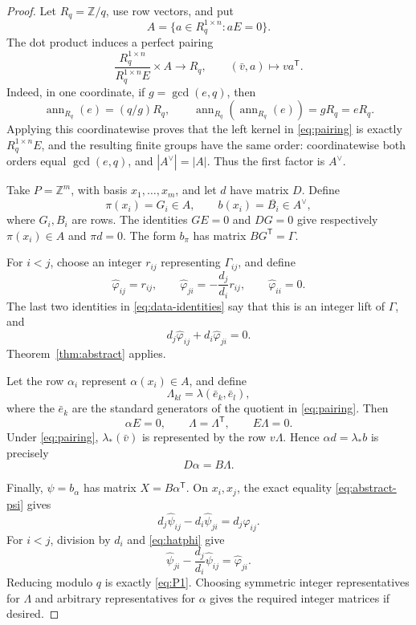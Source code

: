 \documentclass[11pt]{amsart}
\theoremstyle{definition}
\theoremstyle{remark}
\newcommand{\Z}{\mathbb Z}
\newcommand{\ann}{\operatorname{ann}}
\begin{document}
\begin{proof}
Let \(R_q=\Z/q\), use row vectors, and put
\[
                       A=\{a\in R_q^{1\times n}:aE=0\}.
\]
The dot product induces a perfect pairing
\begin{equation}\label{eq:pairing}
 \frac{R_q^{1\times n}}{R_q^{1\times n}E}\times A\longrightarrow R_q,
 \qquad(\bar v,a)\longmapsto va^{\mathsf T}.
\end{equation}
Indeed, in one coordinate, if \(g=\gcd(e,q)\), then
\[
 \ann_{R_q}(e)=(q/g)R_q,\qquad
 \ann_{R_q}(\ann_{R_q}(e))=gR_q=eR_q.
\]
Applying this coordinatewise proves that the left kernel in
\eqref{eq:pairing} is exactly \(R_q^{1\times n}E\), and the resulting
finite groups have the same order: coordinatewise both orders equal
\(\gcd(e,q)\), and \(|A^\vee|=|A|\).  Thus the first factor is
\(A^\vee\).

Take \(P=\Z^m\), with basis \(x_1,\ldots,x_m\), and let \(d\) have
matrix \(D\).  Define
\[
                    \pi(x_i)=G_i\in A,\qquad
                    b(x_i)=\overline{B_i}\in A^\vee,
\]
where \(G_i,B_i\) are rows.  The identities \(GE=0\) and \(DG=0\)
give respectively \(\pi(x_i)\in A\) and \(\pi d=0\).
The form \(b_\pi\) has matrix \(BG^{\mathsf T}=\Gamma\).

For \(i<j\), choose an integer \(r_{ij}\) representing
\(\Gamma_{ij}\), and define
\begin{equation}\label{eq:hatphi}
 \widehat\varphi_{ij}=r_{ij},\qquad
 \widehat\varphi_{ji}=-\frac{d_j}{d_i}r_{ij},\qquad
 \widehat\varphi_{ii}=0.
\end{equation}
The last two identities in \eqref{eq:data-identities} say that this
is an integer lift of \(\Gamma\), and
\[
 d_j\widehat\varphi_{ij}+d_i\widehat\varphi_{ji}=0.
\]
Theorem~\ref{thm:abstract} applies.

Let the row \(\alpha_i\) represent \(\alpha(x_i)\in A\), and define
\[
 \Lambda_{kl}=\lambda(\bar e_k,\bar e_l),
\]
where the \(\bar e_k\) are the standard generators of the quotient
in \eqref{eq:pairing}.  Then
\[
 \alpha E=0,\qquad
 \Lambda=\Lambda^{\mathsf T},\qquad E\Lambda=0.
\]
Under \eqref{eq:pairing}, \(\lambda_*(\bar v)\) is represented by
the row \(v\Lambda\).  Hence \(\alpha d=\lambda_*b\) is precisely
\[
                               D\alpha=B\Lambda.
\]

Finally, \(\psi=b_\alpha\) has matrix \(X=B\alpha^{\mathsf T}\).
On \(x_i,x_j\), the exact equality \eqref{eq:abstract-psi} gives
\[
 d_j\widehat\psi_{ij}-d_i\widehat\psi_{ji}
   =d_j\widehat\varphi_{ij}.
\]
For \(i<j\), division by \(d_i\) and \eqref{eq:hatphi} give
\[
 \widehat\psi_{ji}-\frac{d_j}{d_i}\widehat\psi_{ij}
   =\widehat\varphi_{ji}.
\]
Reducing modulo \(q\) is exactly \eqref{eq:P1}.  Choosing symmetric
integer representatives for \(\Lambda\) and arbitrary representatives
for \(\alpha\) gives the required integer matrices if desired.
\end{proof}
\end{document}
